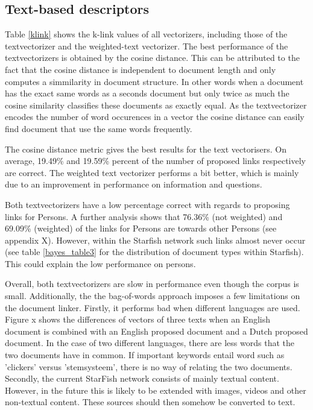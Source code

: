 \subsection{Text-based descriptors}
Table \ref{klink} shows the k-link values of all vectorizers, including those of the textvectorizer and the weighted-text vectorizer. The best performance of the textvectorizers is obtained by the cosine distance. This can be attributed
 to the fact that the cosine distance is independent to document length and only
 computes a simmilarity in document structure. In other words when a document
 has the exact same words as a seconds document but only twice as much the
 cosine similarity classifies these documents as exactly equal. As the textvectorizer
 encodes the number of word occurences in a vector the cosine distance can 
 easily find document that use the same words frequently.

The cosine distance metric gives the best results for the text vectorisers. On average, 19.49\% and 19.59\% percent of the number of proposed links respectively are correct. The weighted text vectorizer performs a bit better, which is mainly due to an improvement in performance on information and questions. %

Both textvectorizers have a low percentage correct with regards to proposing links for Persons. A further analysis shows that 76.36\% (not weighted) and 69.09\% (weighted) of the links for Persons are towards other Persons (see appendix X). However, within the Starfish network such links almost never occur (see table \ref{bayes_table3} for the distribution of document types within Starfish). This could explain the low performance on persons. 

Overall, both textvectorizers are slow in performance even though the corpus is small. Additionally, the the bag-of-words approach imposes a few limitations on the document linker. Firstly, it performs bad when different languages are used. Figure x shows the differences of vectors of three texts when an English document is combined with an English proposed document and a Dutch proposed document. In the case of two different languages, there are less words that the two documents have in common. If important keywords entail word such as 'clickers' versus 'stemsysteem', there is no way of relating the two documents. Secondly, the current StarFish network consists of mainly textual content. However, in the future this is likely to be extended with images, videos and other non-textual content. These sources should then somehow be converted to text.

